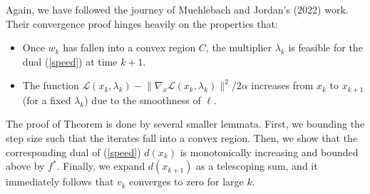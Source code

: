 \documentclass[10pt,a4paper]{article}
\begin{document}
Again, we have followed the journey of Muehlebach and Jordan's (2022) work. Their convergence proof hinges heavily on the properties that:

\begin{itemize}
    \item Once $w_k$ has fallen into a convex region $C$, the multiplier $\lambda_k$ is feasible for the dual (\ref{speed}) at time $k+1$.
    \item The function $\mathcal{L}(x_k,\lambda_k)-\lVert\nabla_x\mathcal{L}(x_k,\lambda_k)\rVert^2/2\alpha$ increases from $x_k$ to $x_{k+1}$ (for a fixed $\lambda_k$) due to the smoothness of $\ell$.
\end{itemize}

The proof of Theorem \hyperref[convthm2]{\thetheoremcnt} is done by several smaller lemmata. First, we bounding the step size such that the iterates fall into a convex region. Then, we show that the corresponding dual of (\ref{speed}) $d(x_k)$ is monotonically increasing and bounded above by $f^*$. Finally, we expand $d(x_{k+1})$ as a telescoping sum, and it immediately follows that $v_k$ converges to zero for large $k$.
\end{document}
